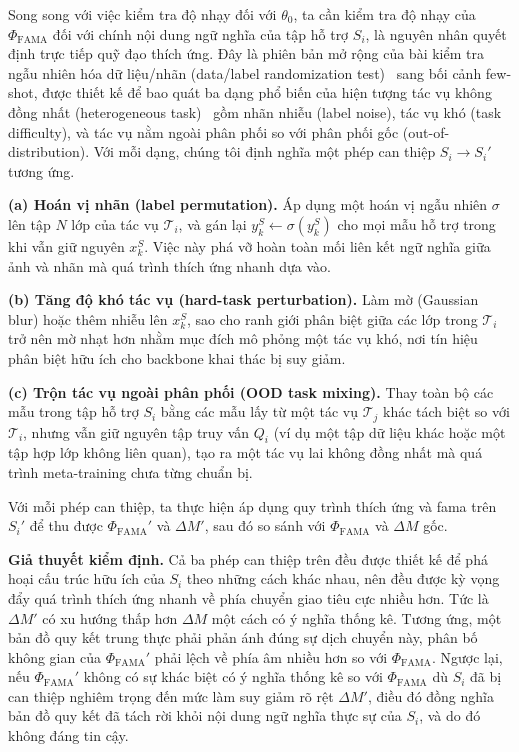 Song song với việc kiểm tra độ nhạy đối với $\theta_0$, ta cần kiểm tra độ nhạy của $\Phi_{\text{FAMA}}$ đối với chính nội dung ngữ nghĩa của tập hỗ trợ $S_i$, là nguyên nhân quyết định trực tiếp quỹ đạo thích ứng. Đây là phiên bản mở rộng của bài kiểm tra ngẫu nhiên hóa dữ liệu/nhãn (data/label randomization test)~\cite{adebayo2018sanity} sang bối cảnh few-shot, được thiết kế để bao quát ba dạng phổ biến của hiện tượng tác vụ không đồng nhất (heterogeneous task)~\cite{si2025meta} gồm nhãn nhiễu (label noise), tác vụ khó (task difficulty), và tác vụ nằm ngoài phân phối so với phân phối gốc (out-of-distribution). Với mỗi dạng, chúng tôi định nghĩa một phép can thiệp $S_i \to S_i'$ tương ứng.
 
\textbf{(a) Hoán vị nhãn (label permutation).} Áp dụng một hoán vị ngẫu nhiên $\sigma$ lên tập $N$ lớp của tác vụ $\mathcal{T}_i$, và gán lại $y_k^S \gets \sigma(y_k^S)$ cho mọi mẫu hỗ trợ trong khi vẫn giữ nguyên $x_k^S$. Việc này phá vỡ hoàn toàn mối liên kết ngữ nghĩa giữa ảnh và nhãn mà quá trình thích ứng nhanh dựa vào.
 
\textbf{(b) Tăng độ khó tác vụ (hard-task perturbation).} Làm mờ (Gaussian blur) hoặc thêm nhiễu lên $x_k^S$, sao cho ranh giới phân biệt giữa các lớp trong $\mathcal{T}_i$ trở nên mờ nhạt hơn nhằm mục đích mô phỏng một tác vụ khó, nơi tín hiệu phân biệt hữu ích cho backbone khai thác bị suy giảm.
 
\textbf{(c) Trộn tác vụ ngoài phân phối (OOD task mixing).} Thay toàn bộ các mẫu trong tập hỗ trợ $S_i$ bằng các mẫu lấy từ một tác vụ $\mathcal{T}_j$ khác tách biệt so với $\mathcal{T}_i$, nhưng vẫn giữ nguyên tập truy vấn $Q_i$ (ví dụ một tập dữ liệu khác hoặc một tập hợp lớp không liên quan), tạo ra một tác vụ lai không đồng nhất mà quá trình meta-training chưa từng chuẩn bị.
 
Với mỗi phép can thiệp, ta thực hiện áp dụng quy trình thích ứng và \acrshort{fama} trên $S_i'$ để thu được $\Phi_{\text{FAMA}}'$ và $\Delta M'$, sau đó so sánh với $\Phi_{\text{FAMA}}$ và $\Delta M$ gốc.
 
\textbf{Giả thuyết kiểm định.} Cả ba phép can thiệp trên đều được thiết kế để phá hoại cấu trúc hữu ích của $S_i$ theo những cách khác nhau, nên đều được kỳ vọng đẩy quá trình thích ứng nhanh về phía chuyển giao tiêu cực nhiều hơn. Tức là $\Delta M'$ có xu hướng thấp hơn $\Delta M$ một cách có ý nghĩa thống kê. Tương ứng, một bản đồ quy kết trung thực phải phản ánh đúng sự dịch chuyển này, phân bố không gian của $\Phi_{\text{FAMA}}'$ phải lệch về phía âm nhiều hơn so với $\Phi_{\text{FAMA}}$. Ngược lại, nếu $\Phi_{\text{FAMA}}'$ không có sự khác biệt có ý nghĩa thống kê so với $\Phi_{\text{FAMA}}$ dù $S_i$ đã bị can thiệp nghiêm trọng đến mức làm suy giảm rõ rệt $\Delta M'$, điều đó đồng nghĩa bản đồ quy kết đã tách rời khỏi nội dung ngữ nghĩa thực sự của $S_i$, và do đó không đáng tin cậy.
 
